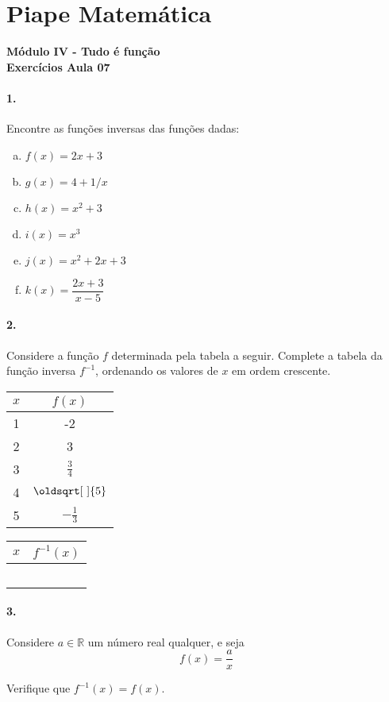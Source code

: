 \documentclass[a4paper,12pt]{article}
\renewcommand*{\sqrt}[2][\ ]{\oldsqrt[#1]{#2}}
\begin{document}
 
  
\section*{Piape Matemática} 
\textbf{Módulo IV - Tudo é função}\\
\textbf{Exercícios Aula 07}    

\begin{multicols}{2} 
 
\paragraph*{1.}  Encontre as funções inversas das funções dadas:

\begin{enumerate}[a)]
\item $f(x) = 2x+3$
\item $g(x) = 4 + 1/x$
\item $h(x) = x^2 + 3$
\item $i(x) = x^3$ 
\item $j(x) = x^2 + 2x + 3$
\item $k(x) = \dfrac{2x + 3}{x - 5}$
\end{enumerate}

\paragraph*{2.} Considere a função $f$ determinada pela tabela a seguir. Complete a tabela da função inversa $f^{-1}$, ordenando os valores de $x$ em ordem crescente.
\begin{center}
\begin{tabular}{|c|c|}
\hline
$x$ & $f(x)$ \\
\hline
1 & -2 \\
2 & 3 \\
3 & $\frac{3}{4}$ \\
4 & $\sqrt{5}$ \\
5 & $-\frac{1}{3}$ \\
\hline
\end{tabular}\hspace*{16mm}
\begin{tabular}{|c|c|}
    \hline
$x$ & $f^{-1}(x)$ \\
\hline
    & \\
    & \\
    & \\
    & \\
    & \\
\hline
\end{tabular}
\end{center}


\paragraph*{3.} Considere $a\in\mathbb{R}$ um número real qualquer, e seja $$f(x) = \frac{a}{x}$$

Verifique que $f^{-1}(x) = f(x)$.

\end{multicols}
\end{document}
